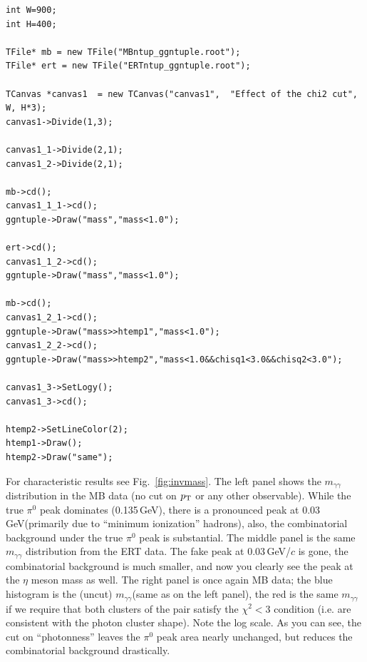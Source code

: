 \documentclass[pdftex,12pt,letter]{article}
\newcommand{\piz}{\mbox{$\pi^0$}\xspace}
\newcommand{\pt}{\mbox{$p_{\rm T}$}\xspace}
\newcommand{\gev}{\mbox{GeV}\xspace}
\newcommand{\gevc}{\mbox{GeV/$c$}\xspace}
\newcommand{\mgg}{\mbox{$m_{\gamma\gamma}$}\xspace}
\begin{document}
\begin{lstlisting}
int W=900;
int H=400;

TFile* mb = new TFile("MBntup_ggntuple.root");
TFile* ert = new TFile("ERTntup_ggntuple.root");

TCanvas *canvas1  = new TCanvas("canvas1",  "Effect of the chi2 cut", W, H*3);
canvas1->Divide(1,3);

canvas1_1->Divide(2,1);
canvas1_2->Divide(2,1);

mb->cd();
canvas1_1_1->cd();
ggntuple->Draw("mass","mass<1.0");

ert->cd();
canvas1_1_2->cd();
ggntuple->Draw("mass","mass<1.0");

mb->cd();
canvas1_2_1->cd();
ggntuple->Draw("mass>>htemp1","mass<1.0");
canvas1_2_2->cd();
ggntuple->Draw("mass>>htemp2","mass<1.0&&chisq1<3.0&&chisq2<3.0");
  
canvas1_3->SetLogy();
canvas1_3->cd();

htemp2->SetLineColor(2);
htemp1->Draw();
htemp2->Draw("same");
\end{lstlisting}
\noindent
For characteristic results see Fig.~\ref{fig:invmass}.  The left panel
shows the \mgg distribution in the MB data (no cut on \pt or any
other observable).  While the true \piz peak dominates (0.135\,\gev),
there is a pronounced peak at 0.03\,\gev (primarily due to 
``minimum ionization'' hadrons),
also, the combinatorial background under the true \piz peak is
substantial.  The middle panel is the same \mgg distribution from the
ERT data.  The fake peak at 0.03\,\gevc is gone, the combinatorial
background is much smaller, and now you clearly see the peak at the
$\eta$ meson mass as well.  The right panel is once again MB data; the
blue histogram is the (uncut) \mgg (same as on the left panel), the
red is the same \mgg if we require that both clusters of the pair
satisfy the $\chi^2<3$ condition (i.e. are consistent with the photon
cluster shape).  Note the log scale.  As you can see, the cut on
``photonness'' leaves the \piz peak area nearly unchanged, but reduces
the combinatorial background drastically.
\end{document}
